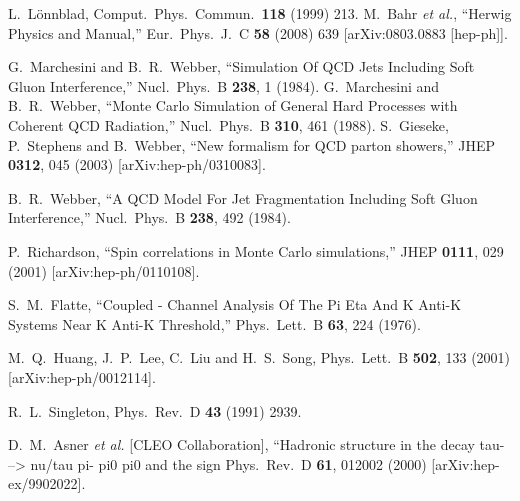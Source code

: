 \documentclass{article}
\begin{document}
\begin{thebibliography}{99}
 L.~L\"onnblad, Comput.~Phys.~Commun.\ {\bf 118} (1999) 213.
  M.~Bahr {\it et al.},
  ``Herwig Physics and Manual,''
  Eur.\ Phys.\ J.\  C {\bf 58} (2008) 639
  [arXiv:0803.0883 [hep-ph]].

  G.~Marchesini and B.~R.~Webber,
  ``Simulation Of QCD Jets Including Soft Gluon Interference,''
  Nucl.\ Phys.\  B {\bf 238}, 1 (1984).
  G.~Marchesini and B.~R.~Webber,
   ``Monte Carlo Simulation of General Hard Processes with Coherent QCD
  Radiation,''
  Nucl.\ Phys.\  B {\bf 310}, 461 (1988).
  S.~Gieseke, P.~Stephens and B.~Webber,
  ``New formalism for QCD parton showers,''
  JHEP {\bf 0312}, 045 (2003)
  [arXiv:hep-ph/0310083].

  B.~R.~Webber,
  ``A QCD Model For Jet Fragmentation Including Soft Gluon Interference,''
  Nucl.\ Phys.\  B {\bf 238}, 492 (1984).

  P.~Richardson,
  ``Spin correlations in Monte Carlo simulations,''
  JHEP {\bf 0111}, 029 (2001)
  [arXiv:hep-ph/0110108].

  S.~M.~Flatte,
   ``Coupled - Channel Analysis Of The Pi Eta And K Anti-K Systems Near K Anti-K
  Threshold,''
  Phys.\ Lett.\  B {\bf 63}, 224 (1976).

  M.~Q.~Huang, J.~P.~Lee, C.~Liu and H.~S.~Song,
  Phys.\ Lett.\  B {\bf 502}, 133 (2001)
  [arXiv:hep-ph/0012114].

  R.~L.~Singleton,
  Phys.\ Rev.\  D {\bf 43} (1991) 2939.

  D.~M.~Asner {\it et al.}  [CLEO Collaboration],
   ``Hadronic structure in the decay tau- --> nu/tau pi- pi0 pi0 and the  sign
  Phys.\ Rev.\  D {\bf 61}, 012002 (2000)
  [arXiv:hep-ex/9902022].


\end{thebibliography}
\end{document}
